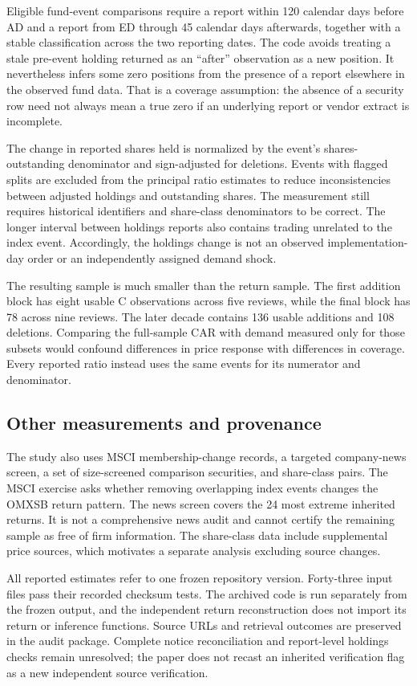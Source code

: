 Eligible fund-event comparisons require a report within 120 calendar days before AD and a report from ED through 45 calendar days afterwards, together with a stable classification across the two reporting dates. The code avoids treating a stale pre-event holding returned as an ``after'' observation as a new position. It nevertheless infers some zero positions from the presence of a report elsewhere in the observed fund data. That is a coverage assumption: the absence of a security row need not always mean a true zero if an underlying report or vendor extract is incomplete.

The change in reported shares held is normalized by the event's shares-outstanding denominator and sign-adjusted for deletions. Events with flagged splits are excluded from the principal ratio estimates to reduce inconsistencies between adjusted holdings and outstanding shares. The measurement still requires historical identifiers and share-class denominators to be correct. The longer interval between holdings reports also contains trading unrelated to the index event. Accordingly, the holdings change is not an observed implementation-day order or an independently assigned demand shock.

The resulting sample is much smaller than the return sample. The first addition block has eight usable C observations across five reviews, while the final block has 78 across nine reviews. The later decade contains 136 usable additions and 108 deletions. Comparing the full-sample CAR with demand measured only for those subsets would confound differences in price response with differences in coverage. Every reported ratio instead uses the same events for its numerator and denominator.

\subsection{Other measurements and provenance}

The study also uses MSCI membership-change records, a targeted company-news screen, a set of size-screened comparison securities, and share-class pairs. The MSCI exercise asks whether removing overlapping index events changes the OMXSB return pattern. The news screen covers the 24 most extreme inherited returns. It is not a comprehensive news audit and cannot certify the remaining sample as free of firm information. The share-class data include supplemental price sources, which motivates a separate analysis excluding source changes.

All reported estimates refer to one frozen repository version. Forty-three input files pass their recorded checksum tests. The archived code is run separately from the frozen output, and the independent return reconstruction does not import its return or inference functions. Source URLs and retrieval outcomes are preserved in the audit package. Complete notice reconciliation and report-level holdings checks remain unresolved; the paper does not recast an inherited verification flag as a new independent source verification.
